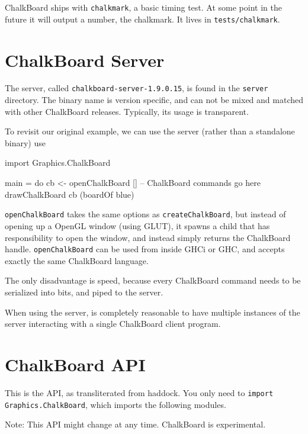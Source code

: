 \documentclass{article}
\newcommand{\cbserver}{\texttt{chalkboard-server-1.9.0.15}}
\begin{document}
ChalkBoard ships with \verb|chalkmark|, a basic timing test. At some point
in the future it will output a number, the chalkmark. It lives in 
\verb|tests/chalkmark|.

\newpage
\section{ChalkBoard Server}\label{sec:server}

The server, called \cbserver, is found in the \verb|server| directory.
The binary name is version specific, and can not be mixed and matched
with other ChalkBoard releases. Typically, its usage is transparent.

To revisit our original example, we can use the server (rather than a standalone
binary) use  

\begin{DSL}[label={ServerExample.hs}]
import Graphics.ChalkBoard

main = do cb <- openChalkBoard []
          -- ChalkBoard commands go here
          drawChalkBoard cb (boardOf blue)
\end{DSL}

\texttt{openChalkBoard} takes the same options as \texttt{createChalkBoard},
but instead of opening up a OpenGL window (using GLUT), it spawns
a child that has responsibility to open the window, and instead simply
returns the ChalkBoard handle. \texttt{openChalkBoard}  can be used 
from inside GHCi or GHC, and accepts exactly the same ChalkBoard language.

The only disadvantage is speed, because every ChalkBoard command needs
to be serialized into bits, and piped to the server.

When using the server, is completely reasonable to have multiple instances
of the server interacting with a single ChalkBoard client program.

\newpage
\section{ChalkBoard API}

This is the API, as transliterated from haddock.
You only need to {\tt import Graphics.ChalkBoard},  which imports
the following modules.

Note: This API might change at any time. ChalkBoard is experimental.








\end{document}
